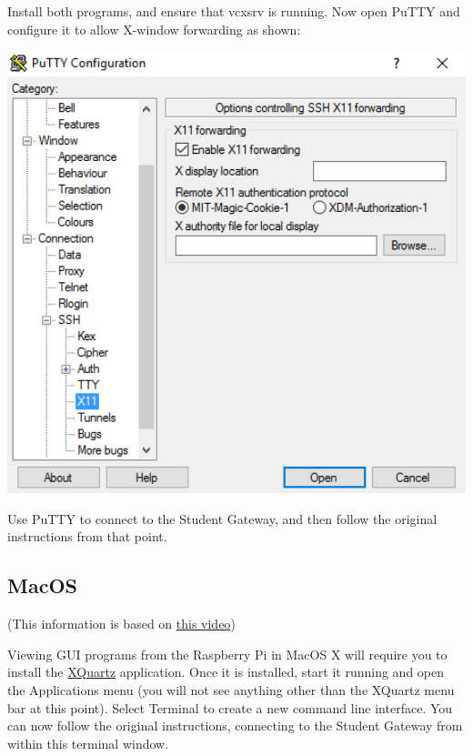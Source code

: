 Install both programs, and ensure that vcxsrv is running.
Now open PuTTY and configure it to allow X-window forwarding as shown:
\begin{center}
  \includegraphics[width=14cm]{figs/PuttyXwin}
\end{center}

Use PuTTY to connect to the Student Gateway, and then follow the original instructions from that point.

\subsection{MacOS}

(This information is based on \href{https://www.youtube.com/watch?v=s6e3cqCISaE}{this video})

Viewing GUI programs from the Raspberry Pi in MacOS X will require you to install the \href{https://www.xquartz.org/}{XQuartz} application.
Once it is installed, start it running and open the Applications menu (you will not see anything other than the XQuartz menu bar at this point).
Select Terminal to create a new command line interface.
You can now follow the original instructions, connecting to the Student Gateway from within this terminal window.

